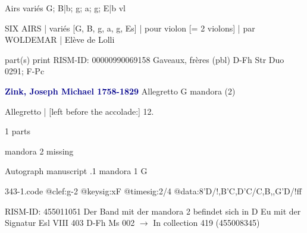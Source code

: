\documentclass[twocolumn]{book}
\begin{document}
\newline Airs variés  G; B|b; g; a; g; E|b  
 vl
\newline \begin{itshape}SIX AIRS | variés [G, B, g, a, g, Es] | pour violon [= 2 violons] | par WOLDEMAR | Elève de Lolli\end{itshape} 
\newline \textcolor{darkblue}{}  part(s)  
\newline print
\newline RISM-ID: 00000990069158
\newline Gaveaux, frères  (pbl)
\newline D-Fh  Str Duo 0291; F-Pc
\newline \par \vspace{7pt} \textcolor{darkblue}{\textbf{Zink, Joseph Michael  1758-1829}}
\newline Allegretto  G  
\newline mandora (2)
\newline \begin{itshape}[f.10r, at left:] Allegretto | [left before the accolade:] 12.\end{itshape} 
\newline \textcolor{darkblue}{}  1 parts  
\newline \begin{small} mandora 2 missing\end{small} 
\newline Autograph manuscript
.1  mandora 1  G  
\begin{filecontents*}{343-1.code}
@clef:g-2
@keysig:xF
@timesig:2/4
@data:8'D/!,B'C,D'C/C,B,,G'D/!ff
\end{filecontents*}
\newline
%

\newline RISM-ID: 455011051
\newline Der Band mit der mandora 2 befindet sich in D Eu mit der Signatur Esl VIII 403
\newline D-Fh  Ms 002
\newline $\rightarrow$ In collection 419 (455008345)
\end{document}
